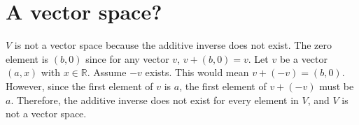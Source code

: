 \section{A vector space?}
$V$ is not a vector space because the additive inverse does not exist.
The zero element is $(b,0)$ since for any vector $v$,
$v + (b,0) = v$.
Let $v$ be a vector $(a, x)$ with $x \in \mathbb{R}$.
Assume $-v$ exists.
This would mean $v + (-v) = (b,0)$.
However, since the first element of $v$ is $a$,
the first element of $v + (-v)$ must be $a$.
Therefore, the additive inverse does not exist for every element in $V$,
 and $V$ is not a vector space.

